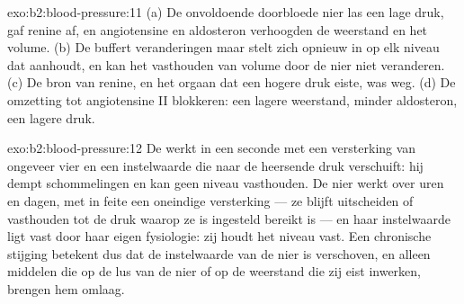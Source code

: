 \begin{solution}{exo:b2:blood-pressure:11}
(a) De onvoldoende doorbloede nier las een lage druk, gaf renine af, en
angiotensine en aldosteron verhoogden de weerstand en het volume. (b) De
 buffert veranderingen maar stelt zich opnieuw in op elk niveau
dat aanhoudt, en kan het vasthouden van volume door de nier niet
veranderen. (c) De bron van renine, en het orgaan dat een hogere druk eiste,
was weg. (d) De omzetting tot angiotensine II blokkeren: een lagere
weerstand, minder aldosteron, een lagere druk.
\end{solution}

\begin{solution}{exo:b2:blood-pressure:12}
De  werkt in een seconde met een versterking van ongeveer vier en
een instelwaarde die naar de heersende druk verschuift: hij dempt
schommelingen en kan geen niveau vasthouden. De nier werkt over uren en
dagen, met in feite een oneindige versterking --- ze blijft uitscheiden of
vasthouden tot de druk waarop ze is ingesteld bereikt is --- en haar
instelwaarde ligt vast door haar eigen fysiologie: zij houdt het niveau vast.
Een chronische stijging betekent dus dat de instelwaarde van de nier is
verschoven, en alleen middelen die op de lus van de nier of op de weerstand
die zij eist inwerken, brengen hem omlaag.
\end{solution}

